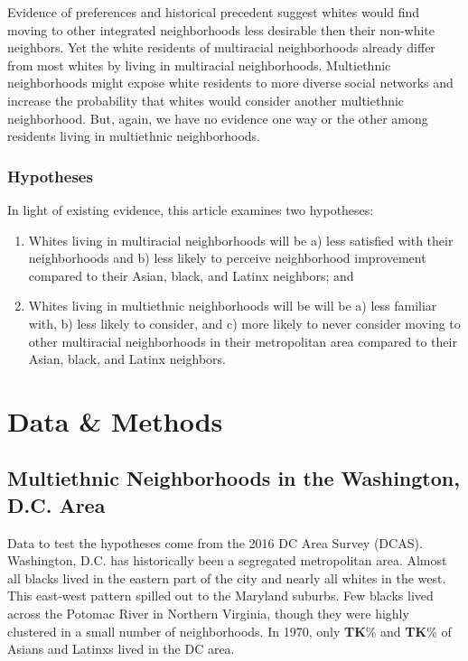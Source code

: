 \documentclass{baderart}
\begin{document}
Evidence of preferences and historical precedent suggest whites would find moving to other integrated neighborhoods less desirable then their non-white neighbors. Yet the white residents of multiracial neighborhoods already differ from most whites by living in multiracial neighborhoods. Multiethnic neighborhoods might expose white residents to more diverse social networks and increase the probability that whites would consider another multiethnic neighborhood. But, again, we have no evidence one way or the other among residents living in multiethnic neighborhoods.

\subsubsection{Hypotheses}\label{hypotheses}

In light of existing evidence, this article examines two hypotheses:


\begin{enumerate} 

\item   Whites living in multiracial neighborhoods will be a) less satisfied  with their neighborhoods and b) less likely to perceive neighborhood  improvement compared to their Asian, black, and Latinx neighbors; and 

\item   Whites living in multiethnic neighborhoods will be will be a) less familiar with, b) less likely to consider, and c) more likely to never consider moving to other multiracial neighborhoods in their metropolitan area compared to their Asian, black, and Latinx neighbors. 

\end{enumerate}

\section{Data \& Methods}\label{data}
\subsection{Multiethnic Neighborhoods in the Washington, D.C. Area}\label{multiethnic-neighborhoods-in-the-washington-d.c.-area}

Data to test the hypotheses come from the 2016 DC Area Survey (DCAS). Washington, D.C. has historically been a segregated metropolitan area. Almost all blacks lived in the eastern part of the city and nearly all whites in the west. This east-west pattern spilled out to the Maryland suburbs. Few blacks lived across the Potomac River in Northern Virginia, though they were highly clustered in a small number of neighborhoods. In 1970, only \textbf{TK}\% and \textbf{TK}\% of Asians and Latinxs lived in the DC area.
\end{document}

